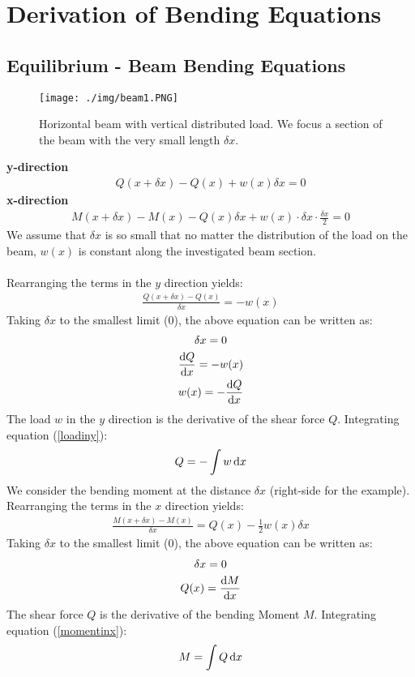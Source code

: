 \section{Derivation of Bending Equations}
\subsection{Equilibrium - Beam Bending Equations}
\begin{figure}[H]
  \centering
  \texttt{[image: ./img/beam1.PNG]}
  \caption{Horizontal beam with vertical distributed load. We focus a section of the beam with the very small length $\delta x$.}
\end{figure}
\textbf{y-direction}
\begin{gather}
  Q(x+\delta x) - Q(x) + w(x)\delta x = 0
\end{gather}
\textbf{x-direction}
\begin{gather}
  M(x+\delta x) - M(x) - Q(x)\delta x + w(x)\cdot \delta x \cdot \frac{\delta x}{2} = 0
\end{gather}
We assume that $\delta x$ is so small that no matter the distribution of the load on the beam, $w(x)$ is constant along the investigated beam section. \\\\
Rearranging the terms in the $y$ direction yields:
\begin{gather}
  \frac{Q(x+\delta x)-Q(x)}{\delta x} = -w(x)
\end{gather}
Taking $\delta x$ to the smallest limit (0), the above equation can be written as:
\begin{gather}
  \delta x = 0 \\
  \frac{\dif Q}{\dif x} = -w(x) \\
  w(x) = -\frac{\dif Q}{\dif x}
  \label{loadiny}
\end{gather}
The load $w$ in the $y$ direction is the derivative of the shear force $Q$. Integrating equation (\ref{loadiny}):
\begin{gather}
  Q = -\int w \dif x
\end{gather}
We consider the bending moment at the distance $\delta x$ (right-side for the example). Rearranging the terms in the $x$ direction yields:
\begin{gather}
  \frac{M(x+\delta x)-M(x)}{\delta x} = Q(x) - \frac{1}{2}w(x)\delta x
\end{gather}
Taking $\delta x$ to the smallest limit (0), the above equation can be written as:
\begin{gather}
  \delta x = 0 \\
  Q(x) = \frac{\dif M}{\dif x} \\
  \label{momentinx}
\end{gather}
The shear force $Q$ is the derivative of the bending Moment $M$. Integrating equation (\ref{momentinx}):
\begin{gather}
  M = \int Q \dif x
\end{gather}
